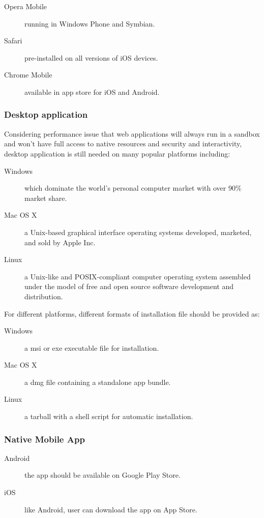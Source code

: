 \begin{description}
\item[Opera Mobile] running in Windows Phone and Symbian.
\item[Safari] pre-installed on all versions of iOS devices.
\item[Chrome Mobile] available in app store for iOS and Android.
\end{description}

\subsubsection{Desktop application}

Considering performance issue that web applications will always run in a sandbox
and won't have full access to native resources and security and interactivity, desktop application
is still needed on many popular platforms including:

\begin{description}
\item[Windows] which dominate the world's personal computer market with over 90\% market share.
\item[Mac OS X] a Unix-based graphical interface operating systems developed, marketed, and sold by Apple Inc.
\item[Linux] a Unix-like and POSIX-compliant computer operating system assembled under the model of free and open source software development and distribution.
\end{description}

For different platforms, different formats of installation file should be provided as:

\begin{description}
\item[Windows] a msi or exe executable file for installation.
\item[Mac OS X] a dmg file containing a standalone app bundle.
\item[Linux] a tarball with a shell script for automatic installation.
\end{description}

\subsubsection{Native Mobile App}

\begin{description}
\item[Android] the app should be available on Google Play Store.
\item[iOS] like Android, user can download the app on App Store.
\end{description}

